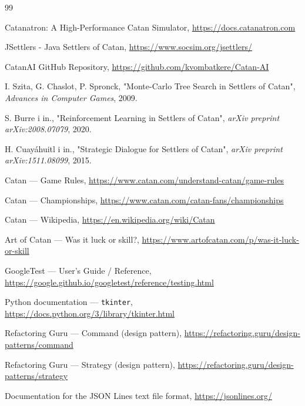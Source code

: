 \documentclass[polish,inz,longabstract]{iithesis}
\begin{document}
\begin{thebibliography}{99}

     Catanatron: A High-Performance Catan Simulator, \url{https://docs.catanatron.com}
    
     JSettlers - Java Settlers of Catan, \url{https://www.socsim.org/jsettlers/}
    
     CatanAI GitHub Repository, \url{https://github.com/kvombatkere/Catan-AI}
    
     I. Szita, G. Chaslot, P. Spronck, "Monte-Carlo Tree Search in Settlers of Catan", \textit{Advances in Computer Games}, 2009.
    
     S. Burre i in., "Reinforcement Learning in Settlers of Catan", \textit{arXiv preprint arXiv:2008.07079}, 2020.
    
     H. Cuayáhuitl i in., "Strategic Dialogue for Settlers of Catan", \textit{arXiv preprint arXiv:1511.08099}, 2015.
    
     Catan — Game Rules, \url{https://www.catan.com/understand-catan/game-rules}
    
     Catan — Championships, \url{https://www.catan.com/catan-fans/championships}
    
     Catan — Wikipedia, \url{https://en.wikipedia.org/wiki/Catan}
    
     Art of Catan — Was it luck or skill?, \url{https://www.artofcatan.com/p/was-it-luck-or-skill}
    
     GoogleTest — User's Guide / Reference, \url{https://google.github.io/googletest/reference/testing.html}
    
     Python documentation — \texttt{tkinter}, \url{https://docs.python.org/3/library/tkinter.html}
    
     Refactoring Guru — Command (design pattern), \url{https://refactoring.guru/design-patterns/command}
    
     Refactoring Guru — Strategy (design pattern), \url{https://refactoring.guru/design-patterns/strategy}
    
     Documentation for the JSON Lines text file format, \url{https://jsonlines.org/}

\end{thebibliography}
\end{document}
